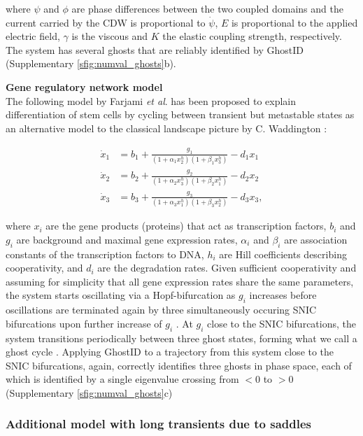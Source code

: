 \documentclass{article}
\theoremstyle{definition}
\begin{document}
\begin{refsection}
where $\psi$ and $\phi$ are phase differences between the two coupled domains and the current carried by the CDW is proportional to $\dot\psi$, $E$ is proportional to the applied electric field, $\gamma$ is the viscous and $K$ the elastic coupling strength, respectively. The system has several ghosts that are reliably identified by GhostID (Supplementary \autoref{sfig:numval_ghosts}b).

\textbf{Gene regulatory network model}\\
The following model by Farjami \textit{et al}. \cite{Farjami_2021} has been proposed to explain differentiation of stem cells by cycling between transient but metastable states as an alternative model to the classical landscape picture by C. Waddington \cite{Kelsh2021}:

\begin{align*}
    \dot{x}_1 &= b_1 + \frac{g_1}{(1 + \alpha_1 x_2^h)(1 + \beta_1 x_3^h)} - d_1 x_1 \\
    \dot{x}_2 &= b_2 + \frac{g_2}{(1 + \alpha_2 x_3^h)(1 + \beta_2 x_1^h)} - d_2 x_2 \nonumber\\
    \dot{x}_3 &= b_3 + \frac{g_3}{(1 + \alpha_3 x_1^h)(1 + \beta_3 x_2^h)} - d_3 x_3, \nonumber
\end{align*}

where $x_i$ are the gene products (proteins) that act as transcription factors, $b_i$ and $g_i$ are background and maximal gene expression rates, $\alpha_i$ and $\beta_i$ are association constants of the transcription factors to DNA, $h_{i}$ are Hill coefficients describing cooperativity, and $d_i$ are the degradation rates. Given sufficient cooperativity and assuming for simplicity that all gene expression rates share the same parameters, the system starts oscillating via a Hopf-bifurcation as $g_i$ increases before oscillations are terminated again by three simultaneously occuring SNIC bifurcations upon further increase of $g_i$ \cite{Farjami_2021}. At $g_i$ close to the SNIC bifurcations, the system transitions periodically between three ghost states, forming what we call a ghost cycle \cite{Farjami_2021,Koch_2024}. Applying GhostID to a trajectory from this system close to the SNIC bifurcations, again, correctly identifies three ghosts in phase space, each of which is identified by a single eigenvalue crossing from $<0$ to $>0$ (Supplementary \autoref{sfig:numval_ghosts}c)\\

\subsubsection{Additional model with long transients due to saddles}\label{subsection:numVal_saddles}


\end{refsection}
\end{document}
